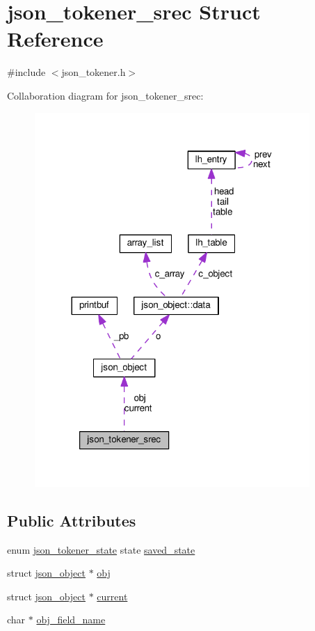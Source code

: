 \hypertarget{structjson__tokener__srec}{}\section{json\+\_\+tokener\+\_\+srec Struct Reference}
\label{structjson__tokener__srec}


{\ttfamily \#include $<$json\+\_\+tokener.\+h$>$}



Collaboration diagram for json\+\_\+tokener\+\_\+srec\+:
\nopagebreak
\begin{figure}[H]
\begin{center}
\leavevmode
\includegraphics[width=296pt]{structjson__tokener__srec__coll__graph}
\end{center}
\end{figure}
\subsection*{Public Attributes}
\begin{DoxyCompactItemize}
\item 
enum \hyperlink{json__tokener_8h_af026dec71e4548e6200eb2f902f1c4e2}{json\+\_\+tokener\+\_\+state} state \hyperlink{structjson__tokener__srec_a868b9912dbb1e4813a630c944f522d48}{saved\+\_\+state}
\item 
struct \hyperlink{structjson__object}{json\+\_\+object} $\ast$ \hyperlink{structjson__tokener__srec_ad2bb71affec1da5ba1d9952c3bf2c12a}{obj}
\item 
struct \hyperlink{structjson__object}{json\+\_\+object} $\ast$ \hyperlink{structjson__tokener__srec_a466f192f920368a5a6375aeba1e2757f}{current}
\item 
char $\ast$ \hyperlink{structjson__tokener__srec_a99551c172e97ac2e7a3849a50b4f51ca}{obj\+\_\+field\+\_\+name}
\end{DoxyCompactItemize}


